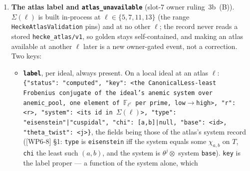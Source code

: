\documentclass[11pt]{article}
\theoremstyle{remark}
\newcommand{\F}{\mathbb{F}}
\begin{document}
\begin{enumerate}[label=(\alph*)]
\begin{itemize}
    \texttt{null}, and the ideal's \texttt{final} is governed by \texttt{sturm\_unavailable}
    as before.
  \end{itemize}
  \texttt{dickson\_count} is the value every \texttt{hecke\_ext/v2} record emitted through
  slot~6 --- a caller input under another name (\texttt{proof\_range} was the unverified
  default \texttt{true}, the M1 qualification of [X] v1.10 \S0) --- and is \textbf{retired}: no
  record after stage~2 item~3 emits it, and a reader treats it as \texttt{caller\_input}.
  \emph{How the decision reaches \texttt{final}}: only through the Sturm route's outcome, which
  the consumer obtains by re-running that route with the decided range --- \texttt{final} never
  reads \texttt{proof\_range} ([C] rule A6; slot-6 WP-9 finding~4: flipping the flag alone and
  re-evaluating \texttt{final} reports no change, which is wrong).
  \textbf{\texttt{anemic\_pool}} (record level; list of primes, ascending; always present from
  the same item on): the pool $T=\{q\le31\}\setminus\{\ell\}$ over which the anemic systems of
  this item and of~(b) are compared. The operators of the pool are computed at the cell for
  that purpose; \texttt{operators\_computed} keeps its meaning (the operators the decomposition
  ran on).
\item \textbf{The atlas label and \texttt{atlas\_unavailable}} (slot-7 owner ruling~3b~(B)).
  $\Sigma(\ell)$ is built in-process at $\ell\in\{5,7,11,13\}$ (the range
  \texttt{HeckeAtlasValidation} pins) and at no other $\ell$; the record never reads a stored
  \texttt{hecke\_atlas/v1}, so golden stays self-contained, and making an atlas available at
  another $\ell$ later is a new owner-gated event, not a correction. Two keys:
  \begin{itemize}
  \item \textbf{\texttt{label}}, per ideal, always present. On a local ideal at an atlas
    $\ell$: \texttt{\{"status": "computed", "key": <the CanonicalLess-least Frobenius
    conjugate of the ideal's anemic system over \texttt{anemic\_pool}, one element of
    $\F_{\ell^r}$ per prime, low$\to$high>, "r": <r>, "system": <its id in $\Sigma(\ell)$>,
    "type": "eisenstein"|"cuspidal", "chi": [a,b]|null, "base": <id>,
    "theta\_twist": <j>\}}, the fields being those of the atlas's system record ([WP6-8] \S1:
    \texttt{type} is \texttt{eisenstein} iff the system equals some $\chi_{a,b}$ on $T$,
    \texttt{chi} the least such $(a,b)$, and the system is $\theta^{j}\otimes$ system
    \texttt{base}). \texttt{key} is the label proper --- a function of the system alone, which

\end{itemize}
\end{enumerate}
\end{document}
